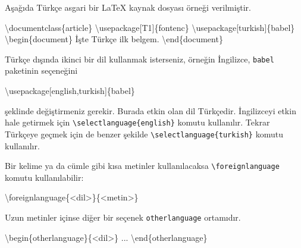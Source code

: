 \documentclass[
  10pt,
]{scrbook}
\newenvironment{Shaded}{\begin{snugshade}}{\end{snugshade}}
\newcommand{\NormalTok}[1]{#1}
\newcommand{\SpecialCharTok}[1]{\textcolor[rgb]{0.00,0.00,0.00}{#1}}
\begin{document}
Aşağıda Türkçe asgari bir LaTeX kaynak dosyası örneği verilmiştir.

\begin{Shaded}
\begin{Highlighting}[]
\NormalTok{\textbackslash{}documentclass\{article\}}
\NormalTok{\textbackslash{}usepackage[T1]\{fontenc\}}
\NormalTok{\textbackslash{}usepackage[turkish]\{babel\}}
\NormalTok{\textbackslash{}begin\{document\}}
\NormalTok{İşte  Türkçe ilk belgem.}
\NormalTok{\textbackslash{}end\{document\}}
\end{Highlighting}
\end{Shaded}

Türkçe dışında ikinci bir dil kullanmak isterseniz, örneğin İngilizce,
\texttt{babel} paketinin seçeneğini

\begin{Shaded}
\begin{Highlighting}[]
\NormalTok{\textbackslash{}usepackage[english,turkish]\{babel\}}
\end{Highlighting}
\end{Shaded}

şeklinde değiştirmeniz gerekir. Burada etkin olan dil Türkçedir.
İngilizceyi etkin hale getirmek için \texttt{\textbackslash{}selectlanguage\{english\}} komutu
kullanılır. Tekrar Türkçeye geçmek için de benzer şekilde
\texttt{\textbackslash{}selectlanguage\{turkish\}} komutu kullanılır.

Bir kelime ya da cümle gibi kısa metinler kullanılacaksa
\texttt{\textbackslash{}foreignlanguage} komutu kullanılabilir:

\begin{Shaded}
\begin{Highlighting}[]
\NormalTok{\textbackslash{}foreignlanguage\{}\SpecialCharTok{\textless{}}\NormalTok{dil}\SpecialCharTok{\textgreater{}}\NormalTok{\}\{}\SpecialCharTok{\textless{}}\NormalTok{metin}\SpecialCharTok{\textgreater{}}\NormalTok{\}}
\end{Highlighting}
\end{Shaded}

Uzun metinler içinse diğer bir seçenek \texttt{otherlanguage} ortamıdır.

\begin{Shaded}
\begin{Highlighting}[]
\NormalTok{\textbackslash{}begin\{otherlanguage\}\{}\SpecialCharTok{\textless{}}\NormalTok{dil}\SpecialCharTok{\textgreater{}}\NormalTok{\}}
\NormalTok{...}
\NormalTok{\textbackslash{}end\{otherlanguage\}}
\end{Highlighting}
\end{Shaded}
\end{document}
